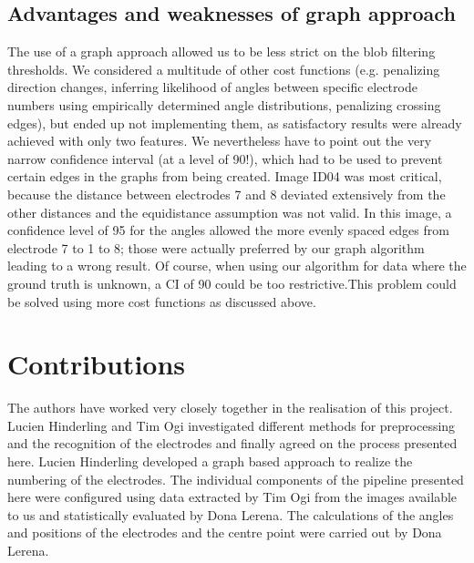 \documentclass[a4paper, 10pt, twocolumn]{article}
\begin{document}
\subsection{Advantages and weaknesses of graph approach}
The use of a graph approach allowed us to be less strict on the blob filtering thresholds. We considered a multitude of other cost functions (e.g. penalizing direction changes, inferring likelihood of angles between specific electrode numbers using empirically determined angle distributions, penalizing crossing edges), but ended up not implementing them, as satisfactory results were already achieved with only two features.
We nevertheless have to point out the very narrow confidence interval (at a level of 90!), which had to be used to prevent certain edges in the graphs from being created. Image ID04 was most critical, because the distance between electrodes 7 and 8 deviated extensively from the other distances and the equidistance assumption was not valid. In this image, a confidence level of 95 for the angles allowed the more evenly spaced edges from electrode 7 to 1 to 8; those were actually preferred by our graph algorithm leading to a wrong result. Of course, when using our algorithm for data where the ground truth is unknown, a CI of 90 could be too restrictive.This problem could be solved using more cost functions as discussed above. 




\section{Contributions}
The authors have worked very closely together in the realisation of this project. Lucien Hinderling and Tim Ogi investigated different methods for preprocessing and the recognition of the electrodes and finally agreed on the process presented here. Lucien Hinderling developed a graph based approach to realize the numbering of the electrodes. The individual components of the pipeline presented here were configured using data extracted by Tim Ogi from the images available to us and statistically evaluated by Dona Lerena. The calculations of the angles and positions of the electrodes and the centre point were carried out by Dona Lerena.



\end{document}
